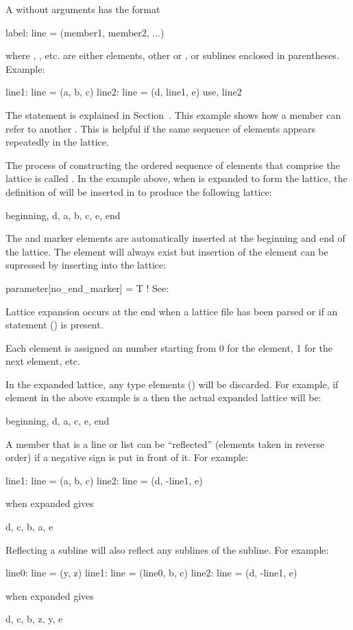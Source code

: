 A  without arguments has the format
\begin{example}
  label: line = (member1, member2, ...)
\end{example}
where , , etc. are either elements, other  or , or sublines enclosed in parentheses.
Example:
\begin{example}
  line1: line = (a, b, c)
  line2: line = (d, line1, e)
  use, line2
\end{example}
The  statement is explained in Section~.
This example shows how a  member can refer to another
. This is helpful if the same sequence of elements
appears repeatedly in the lattice. 

The process of constructing the ordered sequence of elements that
comprise the lattice is called . In the example
above, when  is expanded to form the lattice, the definition
of  will be inserted in to produce the following lattice:
\begin{example}
  beginning, d, a, b, c, e, end
\end{example}
The  and  marker elements are automatically inserted
at the beginning and end of the lattice. The  element will
always exist but insertion of the  element can be supressed by inserting
into the lattice:
\begin{example}
 parameter[no_end_marker] = T    ! See: 
\end{example}
Lattice expansion occurs at the end when a lattice file has been
parsed or if an  statement () is
present.

Each element is assigned an  number starting from 0
for the  element, 1 for the next element, etc.

In the expanded lattice, any  type elements
() will be discarded. For example, if element 
in the above example is a  then the actual expanded
lattice will be:
\begin{example}
  beginning, d, a, c, e, end
\end{example}

A member that is a line or list can be ``reflected''
(elements taken in reverse order) if
a negative sign is put in front of it. For example:
\begin{example}
  line1: line = (a, b, c)
  line2: line = (d, -line1, e)
\end{example}
 when expanded gives
\begin{example}
  d, c, b, a, e
\end{example}
Reflecting a subline will also reflect any sublines of the subline. For
example:
\begin{example}
  line0: line = (y, z)
  line1: line = (line0, b, c)
  line2: line = (d, -line1, e)
\end{example}
 when expanded gives
\begin{example}
  d, c, b, z, y, e
\end{example}

